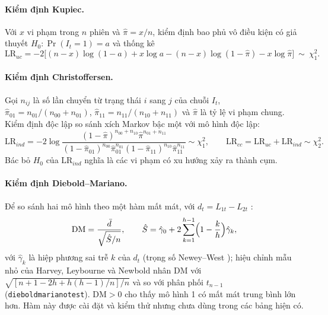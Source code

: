 \documentclass[11pt,a4paper]{article}
\renewcommand{\_}{\gachduoi\allowbreak}
\newcommand{\ham}[1]{\texttt{#1}}
\begin{document}
\paragraph{Kiểm định Kupiec.} Với $x$ vi phạm trong $n$ phiên và $\hat\pi=x/n$, kiểm định bao phủ vô điều kiện \cite{kupiec1995} có giả thuyết $H_0:\Pr(I_t=1)=a$ và thống kê
\begin{equation}
\mathrm{LR}_{uc}=-2\bigl[(n-x)\log(1-a)+x\log a-(n-x)\log(1-\hat\pi)-x\log\hat\pi\bigr]\ \sim\ \chi^2_1 .
\end{equation}

\paragraph{Kiểm định Christoffersen.} Gọi $n_{ij}$ là số lần chuyển từ trạng thái $i$ sang $j$ của chuỗi $I_t$, $\hat\pi_{01}=n_{01}/(n_{00}+n_{01})$, $\hat\pi_{11}=n_{11}/(n_{10}+n_{11})$ và $\hat\pi$ là tỷ lệ vi phạm chung. Kiểm định độc lập \cite{christoffersen1998} so sánh xích Markov bậc một với mô hình độc lập:
\begin{equation}
\mathrm{LR}_{ind}=-2\log\frac{(1-\hat\pi)^{n_{00}+n_{10}}\hat\pi^{n_{01}+n_{11}}}{(1-\hat\pi_{01})^{n_{00}}\hat\pi_{01}^{n_{01}}(1-\hat\pi_{11})^{n_{10}}\hat\pi_{11}^{n_{11}}}\sim\chi^2_1,\qquad
\mathrm{LR}_{cc}=\mathrm{LR}_{uc}+\mathrm{LR}_{ind}\sim\chi^2_2 .
\end{equation}
Bác bỏ $H_0$ của $\mathrm{LR}_{ind}$ nghĩa là các vi phạm có xu hướng xảy ra thành cụm.

\paragraph{Kiểm định Diebold–Mariano.} Để so sánh hai mô hình theo một hàm mất mát, với $d_t=L_{1t}-L_{2t}$ \cite{diebold1995}:
\begin{equation}
\mathrm{DM}=\frac{\bar d}{\sqrt{\hat S/n}},\qquad
\hat S=\hat\gamma_0+2\sum_{k=1}^{h-1}\Bigl(1-\frac{k}{h}\Bigr)\hat\gamma_k,
\end{equation}
với $\hat\gamma_k$ là hiệp phương sai trễ $k$ của $d_t$ (trọng số Newey–West \cite{neweywest1987}); hiệu chỉnh mẫu nhỏ của Harvey, Leybourne và Newbold \cite{hln1997} nhân DM với $\sqrt{[n+1-2h+h(h-1)/n]/n}$ và so với phân phối $t_{n-1}$ (\ham{diebold\_mariano\_test}). $\mathrm{DM}>0$ cho thấy mô hình 1 có mất mát trung bình lớn hơn. Hàm này được cài đặt và kiểm thử nhưng chưa dùng trong các bảng hiện có.
\end{document}
